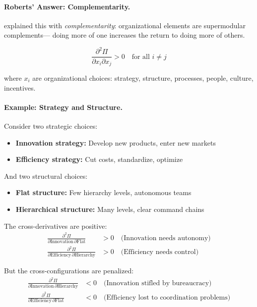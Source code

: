 \paragraph{Roberts' Answer: Complementarity.}
\citet{roberts2004} explained this with \emph{complementarity}:
organizational elements are supermodular complements---
doing more of one increases the return to doing more of others.

\begin{equation}
  \frac{\partial^2 \Pi}{\partial x_i \partial x_j} > 0 
  \quad \text{for all } i \neq j
  \label{eq:supermodularity}
\end{equation}

where $x_i$ are organizational choices: strategy, structure, processes, 
people, culture, incentives.

\paragraph{Example: Strategy and Structure.}
Consider two strategic choices:
\begin{itemize}
  \item \textbf{Innovation strategy:} Develop new products, enter new markets
  \item \textbf{Efficiency strategy:} Cut costs, standardize, optimize
\end{itemize}

And two structural choices:
\begin{itemize}
  \item \textbf{Flat structure:} Few hierarchy levels, autonomous teams
  \item \textbf{Hierarchical structure:} Many levels, clear command chains
\end{itemize}

The cross-derivatives are positive:
\begin{align}
  \frac{\partial^2 \Pi}{\partial \text{Innovation} \, \partial \text{Flat}} &> 0 
  \quad \text{(Innovation needs autonomy)} \\
  \frac{\partial^2 \Pi}{\partial \text{Efficiency} \, \partial \text{Hierarchy}} &> 0 
  \quad \text{(Efficiency needs control)}
\end{align}

But the cross-configurations are penalized:
\begin{align}
  \frac{\partial^2 \Pi}{\partial \text{Innovation} \, \partial \text{Hierarchy}} &< 0 
  \quad \text{(Innovation stifled by bureaucracy)} \\
  \frac{\partial^2 \Pi}{\partial \text{Efficiency} \, \partial \text{Flat}} &< 0 
  \quad \text{(Efficiency lost to coordination problems)}
\end{align}

